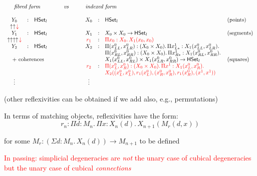 \documentclass[12pt,landscape]{article}
\begin{document}
\begin{Large}
\begin{sf}
$$
\begin{array}{cllccllll}
\multicolumn{3}{c}{\mbox{\emph{fibred form}}} & \qquad\mathit{vs}\qquad & \multicolumn{3}{l}{\mbox{\emph{indexed form}}} \\
\\
Y_0 &:& \HSet_l & & X_0 & : & \HSet_l & \mbox{(points)}\\
\uparrow\uparrow\!\rouge{\downarrow} \\
Y_1 &:& \HSet_l & & X_1 & : & X_0 \times X_0 \rightarrow \HSet_l & \mbox{(segments)}\\
\uparrow\uparrow\uparrow\uparrow\!\rouge{\downarrow} &&&& \rouge{r_1} & : & \rouge{\Pi x_0:X_0.\,X_1(x_0,x_0)}\\
Y_2 &:& \HSet_l & & X_2 & : & \Pi (x^0_{LL},x^0_{LR}):(X_0 \times X_0).\, \Pi x^1_{L*}:X_1 (x^0_{LL},x^0_{LR}).\\
& & & & & & \Pi (x^0_{RL},x^0_{RR}):(X_0 \times X_0).\, \Pi x^1_{R*}:X_1 (x^0_{RL},x^0_{RR}).\, \\
\multicolumn{3}{c}{\mbox{~+ coherences}} & & & & X_1 (x^0_{LL},x^0_{RL}) \times X_1 (x^0_{LR},x^0_{RR}) \rightarrow \HSet_l \qquad & \mbox{(squares)}\\
&&&& \rouge{r_2} & : & \rouge{\Pi (x^0_{L},x^0_{R}):(X_0 \times X_0).\,\Pi x^1:X_1(x^0_L,x^0_R).}\,\\
& & & & & & \rouge{X_2((x^0_{L},x^0_{L}),r_1(x^0_{L}),(x^0_{R},x^0_{R}),r_1(x^0_{R}),(x^1,x^1))}\\
\vdots & & & & \vdots\\
\end{array}
$$

(other reflexivities can be obtained if we add also, e.g., permutations)

\bigskip

In terms of matching objects, reflexivities have the form:
$$r_n: \Pi d:M_n.\,\Pi x:X_n(d).\, X_{n+1}(M_r(d,x))$$

for some $M_r : (\Sigma d:M_n.\,X_n(d)) \rightarrow M_{n+1}$ to be defined

\newpage

\begin{center}
\textcolor{red}{\huge In passing: simplicial degeneracies are
  \emph{not} the unary case of cubical degeneracies but the unary case
  of cubical \emph{connections}}
\end{center}


\end{sf}
\end{Large}
\end{document}
